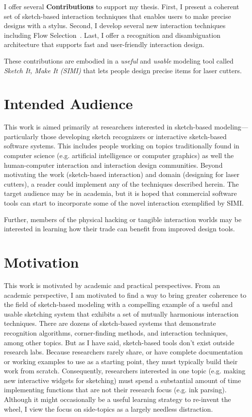 I offer several \textbf{Contributions} to support my thesis. First, I
present a coherent set of sketch-based interaction techniques that
enables users to make precise designs with a stylus. Second, I develop
several new interaction techniques including Flow
Selection~\cite{johnson-flow-selection}. Last, I offer a recognition
and disambiguation architecture that supports fast and user-friendly
interaction design.

These contributions are embodied in a \textit{useful} and
\textit{usable} modeling tool called \textit{Sketch It, Make It
  (SIMI)} that lets people design precise items for laser
cutters.

\section{Intended Audience}

This work is aimed primarily at researchers interested in sketch-based
modeling---particularly those developing sketch recognizers or
interactive sketch-based software systems. This includes people
working on topics traditionally found in computer science
(e.g. artificial intelligence or computer graphics) as well the
human-computer interaction and interaction design communities. Beyond
motivating the work (sketch-based interaction) and domain (designing
for laser cutters), a reader could implement any of the techniques
described herein. The target audience may be in academia, but it is
hoped that commercial software tools can start to incorporate some of
the novel interaction exemplified by SIMI.

Further, members of the physical hacking or tangible interaction
worlds may be interested in learning how their trade can benefit from
improved design tools.

\section{Motivation}

This work is motivated by academic and practical perspectives. From an
academic perspective, I am motivated to find a way to bring greater
coherence to the field of sketch-based modeling with a compelling
example of a useful and usable sketching system that exhibits a set of
mutually harmonious interaction techniques. There are dozens of
sketch-based systems that demonstrate recognition algorithms,
corner-finding methods, and interaction techniques, among other
topics. But as I have said, sketch-based tools don't exist outside
research labs. Because researchers rarely share, or have complete
documentation or working examples to use as a starting point, they
must typically build their work from scratch. Consequently,
researchers interested in one topic (e.g. making new interactive
widgets for sketching) must spend a substantial amount of time
implementing functions that are not their research focus (e.g. ink
parsing). Although it might occasionally be a useful learning strategy
to re-invent the wheel, I view the focus on side-topics as a largely
needless distraction.

